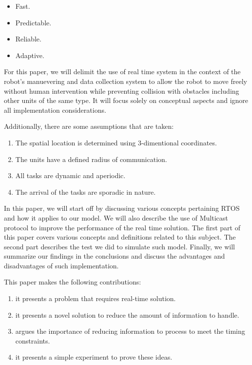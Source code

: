 \documentclass[journal]{IEEEtran}
\begin{document}
\begin{itemize}
\item Fast.
\item Predictable.
\item Reliable.
\item Adaptive.
\end{itemize}

For this paper, we will delimit the use of real time system in the context of the robot's manuevering and data collection system to allow the robot to move freely without human intervention while preventing collision with obstacles including other units of the same type. It will focus solely on conceptual aspects and ignore all implementation considerations. 

Additionally, there are some assumptions that are taken:

\begin{enumerate}
\item The spatial location is determined using 3-dimentional coordinates.
\item The units have a defined radius of communication.
\item All tasks are dynamic and aperiodic.
\item The arrival of the tasks are sporadic in nature.
\end{enumerate}

In this paper, we will start off by discussing various concepts pertaining RTOS and how it applies to our model. We will also describe the use of Multicast protocol to improve the performance of the real time solution. The first part of this paper covers various concepts and definitions related to this subject. The second part describes the test we did to simulate such model. Finally, we will summarize our findings in the conclusions and discuss the advantages and disadvantages of such implementation.

This paper makes the following contributions:
\begin{enumerate}
\item it presents a problem that requires real-time solution.
\item it presents a novel solution to reduce the amount of information to handle.
\item argues the importance of reducing information to process to meet the timing constraints.
\item it presents a simple experiment to prove these ideas.
\end{enumerate}
\end{document}
